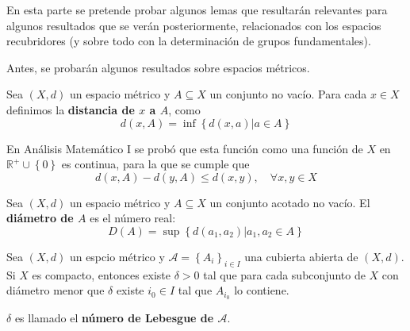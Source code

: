 \documentclass[12pt]{report}
\theoremstyle{largebreak}
\begin{document}
    En esta parte se pretende probar algunos lemas que resultarán relevantes para algunos resultados que se verán posteriormente, relacionados con los espacios recubridores (y sobre todo con la determinación de grupos fundamentales).

    Antes, se probarán algunos resultados sobre espacios métricos.

    \begin{mydef}
        Sea $(X,d)$ un espacio métrico y $A\subseteq X$ un conjunto no vacío. Para cada $x\in X$ definimos la \textbf{distancia de $x$ a $A$}, como
        \begin{equation*}
            d(x,A)=\inf\left\{d(x,a)\Big|a\in A \right\}
        \end{equation*}
    \end{mydef}

    En Análisis Matemático I se probó que esta función como una función de $X$ en $\mathbb{R}^+\cup\left\{0\right\}$ es continua, para la que se cumple que
    \begin{equation*}
        d(x,A)-d(y,A)\leq d(x,y),\quad\forall x,y\in X
    \end{equation*}

    \begin{mydef}
        Sea $(X,d)$ un espacio métrico y $A\subseteq X$ un conjunto acotado no vacío. El \textbf{diámetro de $A$} es el número real:
        \begin{equation*}
            D(A)=\sup\left\{d(a_1,a_2)\Big|a_1,a_2\in A \right\}
        \end{equation*}
    \end{mydef}

    \begin{lema}
        Sea $(X,d)$ un espcio métrico y $\mathcal{A}=\left\{A_i \right\}_{ i\in I}$ una cubierta abierta de $(X,d)$. Si $X$ es compacto, entonces existe $\delta>0$ tal que para cada subconjunto de $X$ con diámetro menor que $\delta$ existe $i_0\in I$ tal que $A_{ i_0}$ lo contiene. 

        $\delta$ es llamado el \textbf{número de Lebesgue de $\mathcal{A}$}.
    \end{lema}
\end{document}
